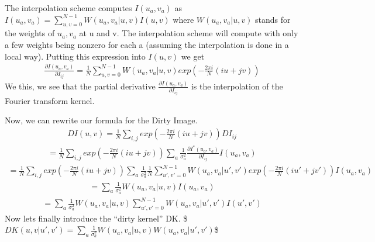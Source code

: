 \documentclass[letterpaper,10pt,english]{jupyterBook}
\begin{document}
\sphinxAtStartPar
The interpolation scheme computes \(I(u_a,v_a)\) as \(I(u_a,v_a) = \sum_{u,v = 0}^{N-1} W(u_a,v_a|u,v)I(u,v)\) where \(W(u_a,v_a|u,v)\) stands for the weights of \(u_a,v_a\) at u and v. The interpolation scheme will compute with only a few weights being non\sphinxhyphen{}zero for each a (assuming the interpolation is done in a local way). Putting this expression into \(I(u,v)\) we get
\begin{equation*}
\begin{split}\frac{\partial I(u_a,v_a)}{\partial I_{ij}} = \frac{1}{N}\sum^{N-1}_{u,v = 0} W(u_a,v_a|u,v) exp(-\frac{2\pi i}{N}(iu+jv))\end{split}
\end{equation*}
\sphinxAtStartPar
We this, we see that the partial derivative \(\frac{\partial I(u_a,v_a)}{\partial I_{ij}}\) is the interpolation of the Fourier transform kernel.

\sphinxAtStartPar
Now, we can rewrite our formula for the Dirty Image.
\begin{equation*}
\begin{split}DI(u,v) = \frac{1}{N}\sum_{i,j} exp(-\frac{2\pi i}{N}(iu+jv))DI_{ij}\end{split}
\end{equation*}\begin{equation*}
\begin{split} = \frac{1}{N}\sum_{i,j} exp(-\frac{2\pi i}{N}(iu+jv)) \sum_a \frac{1}{\sigma^2_a}\frac{\partial I^*(u_a,v_a)}{\partial I_{ij}}I(u_a,v_a)\end{split}
\end{equation*}\begin{equation*}
\begin{split} = \frac{1}{N}\sum_{i,j} exp(-\frac{2\pi i}{N}(iu+jv)) \sum_a \frac{1}{\sigma^2_a}\frac{1}{N}\sum^{N-1}_{u',v' = 0} W(u_a,v_a|u',v') exp(-\frac{2\pi i}{N}(iu'+jv'))I(u_a,v_a)\end{split}
\end{equation*}\begin{equation*}
\begin{split} = \sum_a \frac{1}{\sigma^2_a}W(u_a,v_a|u,v)I(u_a,v_a) \end{split}
\end{equation*}\begin{equation*}
\begin{split} = \sum_a \frac{1}{\sigma^2_a}W(u_a,v_a|u,v)\sum^{N-1}_{u',v' = 0} W(u_a,v_a|u',v')I(u',v')\end{split}
\end{equation*}
\sphinxAtStartPar
Now lets finally introduce the “dirty kernel” DK.
\$\(DK(u,v|u',v') = \sum_a \frac{1}{\sigma^2_a}W(u_a,v_a|u,v)W(u_a,v_a|u',v')\)\$
\end{document}
